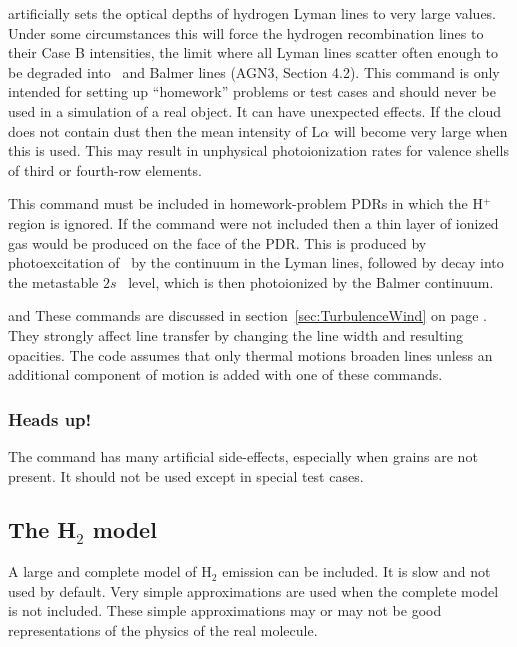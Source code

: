 \documentclass[12pt,twoside]{article}
\begin{document}
 \label{command:CaseB}
artificially sets the
optical depths of hydrogen Lyman lines to
very large values.  Under some circumstances this will force the hydrogen
recombination lines to their Case B intensities, the limit where all Lyman
lines scatter often enough to be degraded into \la\ and
Balmer lines (AGN3, Section 4.2).
This command is only intended for setting up ``homework'' problems or test
cases and should never be used in a simulation of a real object.  It can
have unexpected effects.  If the cloud does not contain dust then the mean
intensity of $\mathrm{L}\alpha$ will become very
large when this is used.  This may result
in unphysical photoionization rates for
valence shells of third or fourth-row elements.

   This command must be included in 
homework-problem PDRs in which the
H$^+$ region is ignored.  If the command were not included then a thin layer
of ionized gas would be produced on the face of the PDR.  This is produced
by photoexcitation of \hO\ by the continuum in the Lyman lines, followed by
decay into the metastable $2s$ \hO\ level, which is then photoionized by the Balmer
continuum.

 and \quad  These
commands are discussed in section~\ref{sec:TurbulenceWind}
on page \pageref{sec:TurbulenceWind}.
They strongly affect line transfer by changing the line width and resulting
opacities.  The code assumes that only thermal motions broaden lines unless
an additional component of motion is added with one of these commands.

\subsubsection{Heads up!}

The  command has many
artificial side-effects, especially when
grains are not present.
It should not be used except in special test cases.

\subsection{The H$_2$ model}

A large and complete model of H$_2$ emission can be included.
It is slow and not used by default.  Very simple approximations
are used when the complete model is not included.  These
simple approximations may or may not be good representations of the physics
of the real molecule.
\end{document}
